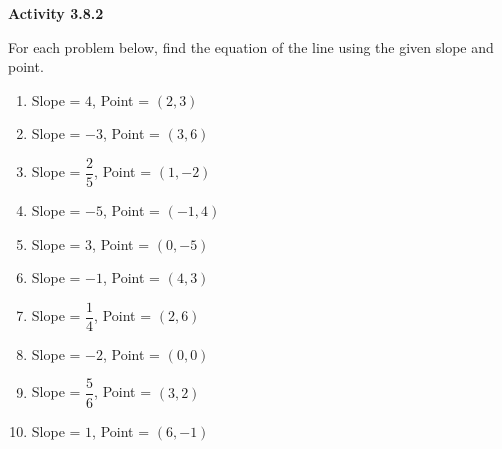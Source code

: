  \vspace{1ex}
\noindent\textbf{Activity 3.8.2}

\vspace{0.75ex}


For each problem below, find the equation of the line using the given slope and point.
\begin{multicols}{2}
\begin{enumerate}[noitemsep, label = \color{blue}\arabic*. ]
    \item Slope = $4$, Point = $(2, 3)$
    \item Slope = $-3$, Point = $(3, 6)$
    \item Slope = $\dfrac{2}{5}$, Point = $(1, -2)$
    \item Slope = $-5$, Point = $(-1, 4)$
    \item Slope = $3$, Point = $(0, -5)$
    \item Slope = $-1$, Point = $(4, 3)$
    \item Slope = $\dfrac{1}{4}$, Point = $(2, 6)$
    \item Slope = $-2$, Point = $(0, 0)$
    \item Slope = $\dfrac{5}{6}$, Point = $(3, 2)$
    \item Slope = $1$, Point = $(6, -1)$
\end{enumerate}
\end{multicols}

